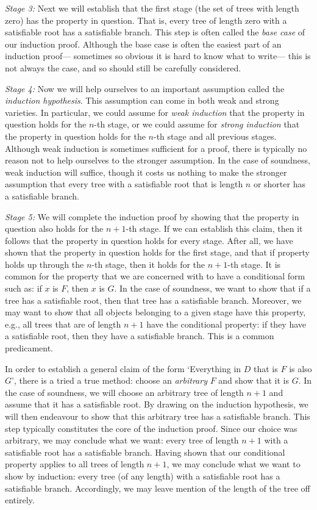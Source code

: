 \textit{Stage 3:} 
Next we will establish that the first stage (the set of trees with length zero) has the property in question.
That is, every tree of length zero with a satisfiable root has a satisfiable branch.
This step is often called the \textit{base case} of our induction proof.
Although the base case is often the easiest part of an induction proof--- sometimes so obvious it is hard to know what to write--- this is not always the case, and so should still be carefully considered.

\textit{Stage 4:} 
Now we will help ourselves to an important assumption called the \textit{induction hypothesis}.
This assumption can come in both weak and strong varieties.
In particular, we could assume for \textit{weak induction} that the property in question holds for the $n$-th stage, or we could assume for \textit{strong induction} that the property in question holds for the $n$-th stage and all previous stages.
Although weak induction is sometimes sufficient for a proof, there is typically no reason not to help ourselves to the stronger assumption.
In the case of soundness, weak induction will suffice, though it costs us nothing to make the stronger assumption that every tree with a satisfiable root that is length $n$ or shorter has a satisfiable branch. 

\textit{Stage 5:} 
We will complete the induction proof by showing that the property in question also holds for the $n+1$-th stage.
If we can establish this claim, then it follows that the property in question holds for every stage.
After all, we have shown that the property in question holds for the first stage, and that if property holds up through the $n$-th stage, then it holds for the $n+1$-th stage.
It is common for the property that we are concerned with to have a conditional form such as: if $x$ is $F$, then $x$ is $G$.
In the case of soundness, we want to show that if a tree has a satisfiable root, then that tree has a satisfiable branch.
Moreover, we may want to show that all objects belonging to a given stage have this property, e.g., all trees that are of length $n+1$ have the conditional property: if they have a satisfiable root, then they have a satisfiable branch. 
This is a common predicament.

In order to establish a general claim of the form `Everything in $D$ that is $F$ is also $G$', there is a tried a true method: choose an \textit{arbitrary} $F$ and show that it is $G$.
In the case of soundness, we will choose an arbitrary tree of length $n+1$ and assume that it has a satisfiable root.
By drawing on the induction hypothesis, we will then endeavour to show that this arbitrary tree has a satisfiable branch. 
This step typically constitutes the core of the induction proof.
Since our choice was arbitrary, we may conclude what we want: every tree of length $n+1$ with a satisfiable root has a satisfiable branch. 
Having shown that our conditional property applies to all trees of length $n+1$, we may conclude what we want to show by induction: every tree (of any length) with a satisfiable root has a satisfiable branch.
Accordingly, we may leave mention of the length of the tree off entirely.

